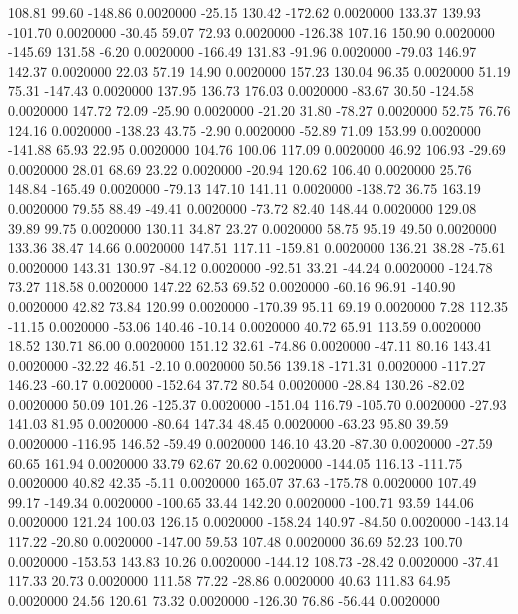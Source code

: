   108.81   99.60 -148.86   0.0020000
  -25.15  130.42 -172.62   0.0020000
  133.37  139.93 -101.70   0.0020000
  -30.45   59.07   72.93   0.0020000
 -126.38  107.16  150.90   0.0020000
 -145.69  131.58   -6.20   0.0020000
 -166.49  131.83  -91.96   0.0020000
  -79.03  146.97  142.37   0.0020000
   22.03   57.19   14.90   0.0020000
  157.23  130.04   96.35   0.0020000
   51.19   75.31 -147.43   0.0020000
  137.95  136.73  176.03   0.0020000
  -83.67   30.50 -124.58   0.0020000
  147.72   72.09  -25.90   0.0020000
  -21.20   31.80  -78.27   0.0020000
   52.75   76.76  124.16   0.0020000
 -138.23   43.75   -2.90   0.0020000
  -52.89   71.09  153.99   0.0020000
 -141.88   65.93   22.95   0.0020000
  104.76  100.06  117.09   0.0020000
   46.92  106.93  -29.69   0.0020000
   28.01   68.69   23.22   0.0020000
  -20.94  120.62  106.40   0.0020000
   25.76  148.84 -165.49   0.0020000
  -79.13  147.10  141.11   0.0020000
 -138.72   36.75  163.19   0.0020000
   79.55   88.49  -49.41   0.0020000
  -73.72   82.40  148.44   0.0020000
  129.08   39.89   99.75   0.0020000
  130.11   34.87   23.27   0.0020000
   58.75   95.19   49.50   0.0020000
  133.36   38.47   14.66   0.0020000
  147.51  117.11 -159.81   0.0020000
  136.21   38.28  -75.61   0.0020000
  143.31  130.97  -84.12   0.0020000
  -92.51   33.21  -44.24   0.0020000
 -124.78   73.27  118.58   0.0020000
  147.22   62.53   69.52   0.0020000
  -60.16   96.91 -140.90   0.0020000
   42.82   73.84  120.99   0.0020000
 -170.39   95.11   69.19   0.0020000
    7.28  112.35  -11.15   0.0020000
  -53.06  140.46  -10.14   0.0020000
   40.72   65.91  113.59   0.0020000
   18.52  130.71   86.00   0.0020000
  151.12   32.61  -74.86   0.0020000
  -47.11   80.16  143.41   0.0020000
  -32.22   46.51   -2.10   0.0020000
   50.56  139.18 -171.31   0.0020000
 -117.27  146.23  -60.17   0.0020000
 -152.64   37.72   80.54   0.0020000
  -28.84  130.26  -82.02   0.0020000
   50.09  101.26 -125.37   0.0020000
 -151.04  116.79 -105.70   0.0020000
  -27.93  141.03   81.95   0.0020000
  -80.64  147.34   48.45   0.0020000
  -63.23   95.80   39.59   0.0020000
 -116.95  146.52  -59.49   0.0020000
  146.10   43.20  -87.30   0.0020000
  -27.59   60.65  161.94   0.0020000
   33.79   62.67   20.62   0.0020000
 -144.05  116.13 -111.75   0.0020000
   40.82   42.35   -5.11   0.0020000
  165.07   37.63 -175.78   0.0020000
  107.49   99.17 -149.34   0.0020000
 -100.65   33.44  142.20   0.0020000
 -100.71   93.59  144.06   0.0020000
  121.24  100.03  126.15   0.0020000
 -158.24  140.97  -84.50   0.0020000
 -143.14  117.22  -20.80   0.0020000
 -147.00   59.53  107.48   0.0020000
   36.69   52.23  100.70   0.0020000
 -153.53  143.83   10.26   0.0020000
 -144.12  108.73  -28.42   0.0020000
  -37.41  117.33   20.73   0.0020000
  111.58   77.22  -28.86   0.0020000
   40.63  111.83   64.95   0.0020000
   24.56  120.61   73.32   0.0020000
 -126.30   76.86  -56.44   0.0020000
